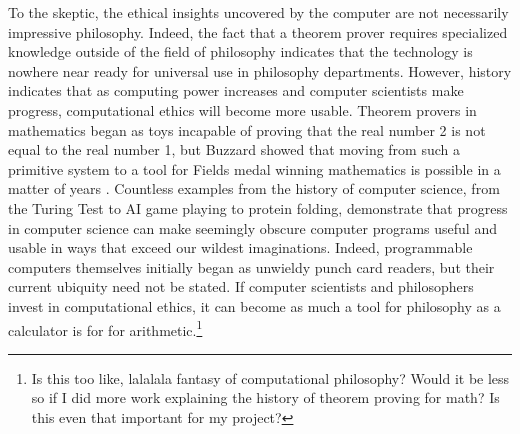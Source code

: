 \begin{isabellebody}
\begin{isamarkuptext}
To the skeptic, the ethical insights uncovered by the computer are not necessarily impressive 
philosophy. Indeed, the fact that a theorem prover requires specialized knowledge outside of the field 
of philosophy indicates that the technology is nowhere near ready for universal use in philosophy 
departments. However, history indicates that as computing power increases and computer scientists make 
progress, computational ethics will become more usable. Theorem provers in mathematics began as toys 
incapable of proving that the real number 2 is not equal to the real number 1, but Buzzard showed that 
moving from such a primitive system to a tool for Fields medal winning mathematics is possible in a 
matter of years \cite{buzzardvideo}. Countless examples from the history of computer science, from the Turing 
Test to AI game playing to protein folding, demonstrate that progress in computer science can make seemingly 
obscure computer programs useful and usable in ways that exceed our wildest imaginations. Indeed, 
programmable computers themselves initially began as unwieldy punch card readers, but their current ubiquity 
need not be stated. If computer scientists and philosophers invest in computational ethics, it can 
become as much a tool for philosophy as a calculator is for for arithmetic.\footnote{Is this too like, 
lalalala fantasy of computational philosophy? Would it be less so if I did more work explaining 
the history of theorem proving for math? Is this even that important for my project?}%
\end{isamarkuptext}\isamarkuptrue%
%
\isadelimdocument
%
\endisadelimdocument
%
\isatagdocument
%
\isamarkuptrue%
%
\isamarkuptrue%
%
\isamarkuptrue%
%
\endisatagdocument
{\isafolddocument}%
%
\isadelimdocument
%
\endisadelimdocument
%
\isadelimtheory
%
\endisadelimtheory
%
\isatagtheory
%
\endisatagtheory
{\isafoldtheory}%
%
\isadelimtheory
%
\endisadelimtheory
%
\end{isabellebody}%
\endinput
